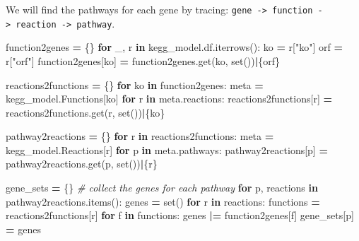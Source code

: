 \documentclass[
]{book}
\newenvironment{Shaded}{\begin{snugshade}}{\end{snugshade}}
\newcommand{\BuiltInTok}[1]{#1}
\newcommand{\CommentTok}[1]{\textcolor[rgb]{0.56,0.35,0.01}{\textit{#1}}}
\newcommand{\ControlFlowTok}[1]{\textcolor[rgb]{0.13,0.29,0.53}{\textbf{#1}}}
\newcommand{\KeywordTok}[1]{\textcolor[rgb]{0.13,0.29,0.53}{\textbf{#1}}}
\newcommand{\NormalTok}[1]{#1}
\newcommand{\OperatorTok}[1]{\textcolor[rgb]{0.81,0.36,0.00}{\textbf{#1}}}
\newcommand{\StringTok}[1]{\textcolor[rgb]{0.31,0.60,0.02}{#1}}
\begin{document}
We will find the pathways for each gene by tracing: \texttt{gene\ -\textgreater{}\ function\ -\textgreater{}\ reaction\ -\textgreater{}\ pathway}.

\begin{Shaded}
\begin{Highlighting}[numbers=left,,]
\NormalTok{function2genes }\OperatorTok{=}\NormalTok{ \{\}}
\ControlFlowTok{for}\NormalTok{ \_, r }\KeywordTok{in}\NormalTok{ kegg\_model.df.iterrows():}
\NormalTok{    ko }\OperatorTok{=}\NormalTok{ r[}\StringTok{"ko"}\NormalTok{]}
\NormalTok{    orf }\OperatorTok{=}\NormalTok{ r[}\StringTok{"orf"}\NormalTok{]}
\NormalTok{    function2genes[ko] }\OperatorTok{=}\NormalTok{ function2genes.get(ko, }\BuiltInTok{set}\NormalTok{())}\OperatorTok{|}\NormalTok{\{orf\}}

\NormalTok{reactions2functions }\OperatorTok{=}\NormalTok{ \{\}}
\ControlFlowTok{for}\NormalTok{ ko }\KeywordTok{in}\NormalTok{ function2genes:}
\NormalTok{    meta }\OperatorTok{=}\NormalTok{ kegg\_model.Functions[ko]}
    \ControlFlowTok{for}\NormalTok{ r }\KeywordTok{in}\NormalTok{ meta.reactions:}
\NormalTok{        reactions2functions[r] }\OperatorTok{=}\NormalTok{ reactions2functions.get(r, }\BuiltInTok{set}\NormalTok{())}\OperatorTok{|}\NormalTok{\{ko\}}

\NormalTok{pathway2reactions }\OperatorTok{=}\NormalTok{ \{\}}
\ControlFlowTok{for}\NormalTok{ r }\KeywordTok{in}\NormalTok{ reactions2functions:}
\NormalTok{    meta }\OperatorTok{=}\NormalTok{ kegg\_model.Reactions[r]}
    \ControlFlowTok{for}\NormalTok{ p }\KeywordTok{in}\NormalTok{ meta.pathways:}
\NormalTok{        pathway2reactions[p] }\OperatorTok{=}\NormalTok{ pathway2reactions.get(p, }\BuiltInTok{set}\NormalTok{())}\OperatorTok{|}\NormalTok{\{r\}}

\NormalTok{gene\_sets }\OperatorTok{=}\NormalTok{ \{\} }\CommentTok{\# collect the genes for each pathway}
\ControlFlowTok{for}\NormalTok{ p, reactions }\KeywordTok{in}\NormalTok{ pathway2reactions.items():}
\NormalTok{    genes }\OperatorTok{=} \BuiltInTok{set}\NormalTok{()}
    \ControlFlowTok{for}\NormalTok{ r }\KeywordTok{in}\NormalTok{ reactions:}
\NormalTok{        functions }\OperatorTok{=}\NormalTok{ reactions2functions[r]}
        \ControlFlowTok{for}\NormalTok{ f }\KeywordTok{in}\NormalTok{ functions:}
\NormalTok{            genes }\OperatorTok{|=}\NormalTok{ function2genes[f]}
\NormalTok{    gene\_sets[p] }\OperatorTok{=}\NormalTok{ genes}
\end{Highlighting}
\end{Shaded}
\end{document}

